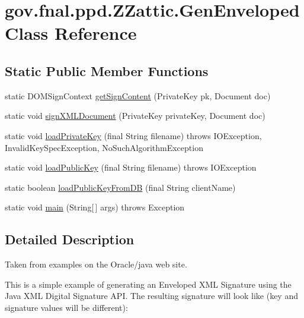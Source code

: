 \hypertarget{classgov_1_1fnal_1_1ppd_1_1ZZattic_1_1GenEnveloped}{\section{gov.\-fnal.\-ppd.\-Z\-Zattic.\-Gen\-Enveloped Class Reference}
\label{classgov_1_1fnal_1_1ppd_1_1ZZattic_1_1GenEnveloped}
}
\subsection*{Static Public Member Functions}
\begin{DoxyCompactItemize}
\item 
static D\-O\-M\-Sign\-Context \hyperlink{classgov_1_1fnal_1_1ppd_1_1ZZattic_1_1GenEnveloped_a69be7eea0c284cf04dc66e76138895a8}{get\-Sign\-Content} (Private\-Key pk, Document doc)
\item 
static void \hyperlink{classgov_1_1fnal_1_1ppd_1_1ZZattic_1_1GenEnveloped_aa8e572349a537781033c6e6313e49dbb}{sign\-X\-M\-L\-Document} (Private\-Key private\-Key, Document doc)
\item 
static void \hyperlink{classgov_1_1fnal_1_1ppd_1_1ZZattic_1_1GenEnveloped_a80d09b491d9a3a3c64651101e5510065}{load\-Private\-Key} (final String filename)  throws I\-O\-Exception, Invalid\-Key\-Spec\-Exception, No\-Such\-Algorithm\-Exception 
\item 
static void \hyperlink{classgov_1_1fnal_1_1ppd_1_1ZZattic_1_1GenEnveloped_abf95b0c7110d6a16d5329e91606475de}{load\-Public\-Key} (final String filename)  throws I\-O\-Exception 
\item 
static boolean \hyperlink{classgov_1_1fnal_1_1ppd_1_1ZZattic_1_1GenEnveloped_a303d48c06a4ed04baa8d16799f4fc8a0}{load\-Public\-Key\-From\-D\-B} (final String client\-Name)
\item 
static void \hyperlink{classgov_1_1fnal_1_1ppd_1_1ZZattic_1_1GenEnveloped_a46554c2e6c56eb3fa74c7a794ced385e}{main} (String\mbox{[}$\,$\mbox{]} args)  throws Exception 
\end{DoxyCompactItemize}


\subsection{Detailed Description}
Taken from examples on the Oracle/java web site.

This is a simple example of generating an Enveloped X\-M\-L Signature using the Java X\-M\-L Digital Signature A\-P\-I. The resulting signature will look like (key and signature values will be different)\-:


